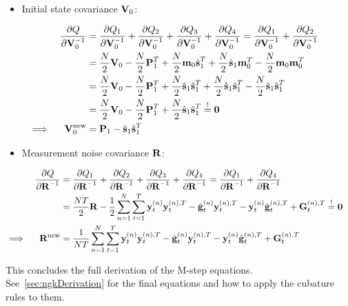 		\begin{itemize}
			\item Initial state covariance \(\boldsymbol{\mathrm{V}}_0\):
		\end{itemize}
		\begin{align}
			&&\pdv{Q}{\boldsymbol{\mathrm{V}}_0^{-1}}
				&= \pdv{Q_1}{\boldsymbol{\mathrm{V}}_0^{-1}} + \pdv{Q_2}{\boldsymbol{\mathrm{V}}_0^{-1}} + \pdv{Q_3}{\boldsymbol{\mathrm{V}}_0^{-1}} + \pdv{Q_4}{\boldsymbol{\mathrm{V}}_0^{-1}} = \pdv{Q_1}{\boldsymbol{\mathrm{V}}_0^{-1}} + \pdv{Q_2}{\boldsymbol{\mathrm{V}}_0^{-1}} & \nonumber \\
			&&	&= \frac{N}{2} \boldsymbol{\mathrm{V}}_0 - \frac{N}{2} \boldsymbol{\mathrm{P}}_1^T + \frac{N}{2} \boldsymbol{\mathrm{m}}_0 \hat{\boldsymbol{\mathrm{s}}}_1^T + \frac{N}{2} \hat{\boldsymbol{\mathrm{s}}}_1 \boldsymbol{\mathrm{m}}_0^T - \frac{N}{2} \boldsymbol{\mathrm{m}}_0 \boldsymbol{\mathrm{m}}_0^T & \nonumber \\
			&&	&= \frac{N}{2} \boldsymbol{\mathrm{V}}_0 - \frac{N}{2} \boldsymbol{\mathrm{P}}_1^T + \frac{N}{2} \hat{\boldsymbol{\mathrm{s}}}_1 \hat{\boldsymbol{\mathrm{s}}}_1^T + \frac{N}{2} \hat{\boldsymbol{\mathrm{s}}}_1 \hat{\boldsymbol{\mathrm{s}}}_1^T - \frac{N}{2} \hat{\boldsymbol{\mathrm{s}}}_1 \hat{\boldsymbol{\mathrm{s}}}_1^T & \nonumber \\
			&&	&= \frac{N}{2} \boldsymbol{\mathrm{V}}_0 - \frac{N}{2} \boldsymbol{\mathrm{P}}_1^T + \frac{N}{2} \hat{\boldsymbol{\mathrm{s}}}_1 \hat{\boldsymbol{\mathrm{s}}}_1^T \overset{!}{=} \boldsymbol{\mathrm{0}} & \nonumber \\
			\implies && \boldsymbol{\mathrm{V}}_0^{\mathrm{new}} &= \boldsymbol{\mathrm{P}}_1 - \hat{\boldsymbol{\mathrm{s}}}_1 \hat{\boldsymbol{\mathrm{s}}}_1^T & \label{eq:initialStateCovariance}
		\end{align}

		\begin{itemize}
			\item Measurement noise covariance \(\boldsymbol{\mathrm{R}}\):
		\end{itemize}
		\begin{align}
			&&\pdv{Q}{\boldsymbol{\mathrm{R}}^{-1}}
				&= \pdv{Q_1}{\boldsymbol{\mathrm{R}}^{-1}} + \pdv{Q_2}{\boldsymbol{\mathrm{R}}^{-1}} + \pdv{Q_3}{\boldsymbol{\mathrm{R}}^{-1}} + \pdv{Q_4}{\boldsymbol{\mathrm{R}}^{-1}} = \pdv{Q_1}{\boldsymbol{\mathrm{R}}^{-1}} + \pdv{Q_4}{\boldsymbol{\mathrm{R}}^{-1}} & \nonumber \\
			&&	&= \frac{NT}{2} \boldsymbol{\mathrm{R}} - \frac{1}{2} \sum_{n = 1}^{N} \sum_{t = 1}^{T} \boldsymbol{\mathrm{y}}_t^{(n)} \boldsymbol{\mathrm{y}}_t^{(n), T} - \hat{\boldsymbol{\mathrm{g}}}_t^{(n)} \boldsymbol{\mathrm{y}}_t^{(n), T} - \boldsymbol{\mathrm{y}}_t^{(n)} \hat{\boldsymbol{\mathrm{g}}}_t^{(n), T} + \boldsymbol{\mathrm{G}}_t^{(n), T} \overset{!}{=} \boldsymbol{\mathrm{0}} & \nonumber \\
			\implies && \boldsymbol{\mathrm{R}}^{\mathrm{new}} &= \frac{1}{NT} \sum_{n = 1}^{N} \sum_{t = 1}^{T} \boldsymbol{\mathrm{y}}_t^{(n)} \boldsymbol{\mathrm{y}}_t^{(n), T} - \hat{\boldsymbol{\mathrm{g}}}_t^{(n)} \boldsymbol{\mathrm{y}}_t^{(n), T} - \boldsymbol{\mathrm{y}}_t^{(n)} \hat{\boldsymbol{\mathrm{g}}}_t^{(n), T} + \boldsymbol{\mathrm{G}}_t^{(n), T} & \label{eq:measurementNoiseCovariance}
		\end{align}

		This concludes the full derivation of the M-step equations. See~\autoref{sec:ngkDerivation} for the final equations and how to apply the cubature rules to them.

